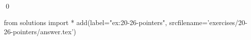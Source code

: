 
\begin{ex}
  \label{ex:20-26-pointers}
  
  \qed
\end{ex}
\begin{python0}
from solutions import *
add(label="ex:20-26-pointers",
    srcfilename='exercises/20-26-pointers/answer.tex')
\end{python0}
